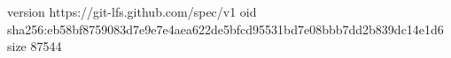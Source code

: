 version https://git-lfs.github.com/spec/v1
oid sha256:eb58bf8759083d7e9e7e4aea622de5bfcd95531bd7e08bbb7dd2b839dc14e1d6
size 87544
